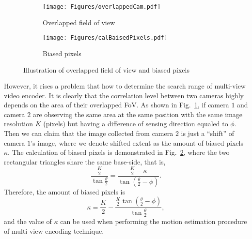 \begin{figure}
\begin{center}
\begin{subfigure}[b]{0.65\columnwidth}
\texttt{[image: Figures/overlappedCam.pdf]}
\caption{\label{fig::overlappedCam}Overlapped field of view}
\end{subfigure}
\begin{subfigure}[b]{0.5\columnwidth}
\texttt{[image: Figures/calBaisedPixels.pdf]}
\caption{\label{fig::calBaisedPixels}Biased pixels}
\end{subfigure}
\caption{\label{fig::overlappedAndBaised}Illustration of overlapped field of view and biased pixels}
\end{center}
\end{figure}
%
However, it rises a problem that how to determine the search range of multi-view video encoder.
It is clearly that the correlation level between two cameras highly depends on the area of their overlapped FoV.
As shown in Fig.~\ref{fig::overlappedCam}, if camera $1$ and camera $2$ are observing the same area at the same position with the same image resolution $K$ (pixels) but having a difference of sensing direction equaled to $\phi$.
Then we can claim that the image collected from camera $2$ is just a ``shift'' of camera $1$'s image, where we denote shifted extent as the amount of biased pixels $\kappa$.
The calculation of biased pixels is demonstrated in Fig.~\ref{fig::calBaisedPixels}, where the two rectangular triangles share the same base-side, that is,
\begin{equation}
\frac{\frac{K}{2}}{\tan \frac{\theta}{2}} = \frac{\frac{K}{2}-\kappa}{\tan(\frac{\theta}{2}-\phi)}.
\label{eq::calBiasedPixels}
\end{equation}
Therefore, the amount of biased pixels is
\begin{equation}
\kappa = \frac{K}{2} - \frac{\frac{K}{2} \tan(\frac{\theta}{2}-\phi) }{\tan \frac{\theta}{2}},
\label{eq::biasedPixels}
\end{equation}
and the value of $\kappa$ can be used when performing the motion estimation procedure of multi-view encoding technique.
%